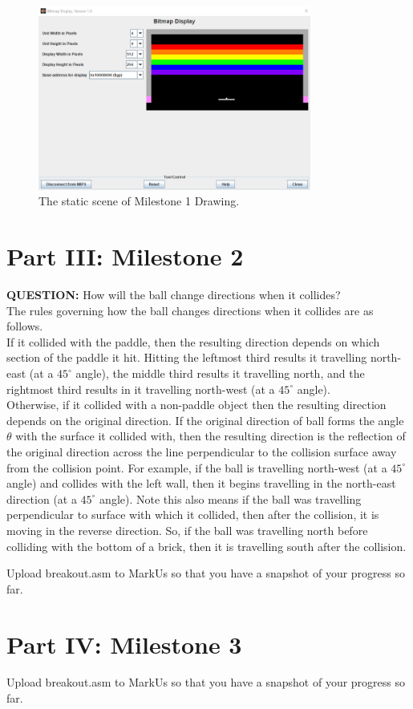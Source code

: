 \documentclass{article}
\begin{document}
\begin{enumerate}
\begin{figure}[ht!]
    \centering
    \includegraphics[width=0.8\textwidth]{milestone1_drawing.png}
    \caption{The static scene of Milestone 1 Drawing.}
    \label{f:milestone1_drawing}
\end{figure}

\end{enumerate}


\newpage

\section{Part III: Milestone 2}

\item \textbf{QUESTION: } How will the ball change directions when it collides? \\[0.4em]
The rules governing how the ball changes directions when it collides are as follows. \\[0.4em]
If it collided with the paddle, then the resulting direction depends on which section of the paddle it hit.
Hitting the leftmost third results it travelling north-east (at a $45^\circ$ angle), the middle third results it travelling north, and the rightmost third results in it travelling north-west (at a $45^\circ$ angle). \\[0.4em]
Otherwise, if it collided with a non-paddle object then the resulting direction depends on the original direction.
If the original direction of ball forms the angle $\theta$ with the surface it collided with, 
then the resulting direction is the reflection of the original direction across the line perpendicular to the collision surface away from the collision point.
For example, if the ball is travelling north-west (at a $45^\circ$ angle) and collides with the left wall, then it begins travelling in the north-east direction (at a $45^\circ$ angle).
Note this also means if the ball was travelling perpendicular to surface with which it collided, then after the collision, it is moving in the reverse direction.
So, if the ball was travelling north before colliding with the bottom of a brick, then it is travelling south after the collision.
\item Upload breakout.asm to MarkUs so that you have a snapshot of your progress so far.

\section{Part IV: Milestone 3}
\item Upload breakout.asm to MarkUs so that you have a snapshot of your progress so far.
\end{document}
